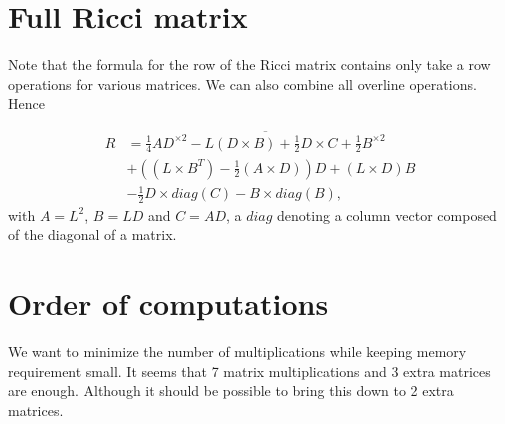 \documentclass[12pt]{amsart}
\begin{document}
\section{Full Ricci matrix}
Note that the formula for the row of the Ricci matrix contains only take a row operations for various matrices. We can also combine all overline operations. Hence

\begin{align*}
    R &= \overline{\frac{1}{4}AD^{\times2} -L(D\times B) +\frac{1}{2}D\times C + \frac{1}{2}B^{\times2}}
    \\&
    +\left((L\times B^T)-  \frac{1}{2}(A\times D)\right)D +(L\times D) B
     \\&
     - \frac{1}{2}D\times diag(C) - B\times diag(B),
\end{align*}
with $A=L^2$, $B=LD$ and $C=AD$, a $diag$ denoting a column vector composed of the diagonal of a matrix.

\section{Order of computations}
\label{sec:OrderOfComputations}

We want to minimize the number of multiplications while keeping memory requirement small. It seems that 7 matrix multiplications and 3 extra matrices are enough. Although it should be possible to bring this down to 2 extra matrices.
\end{document}
